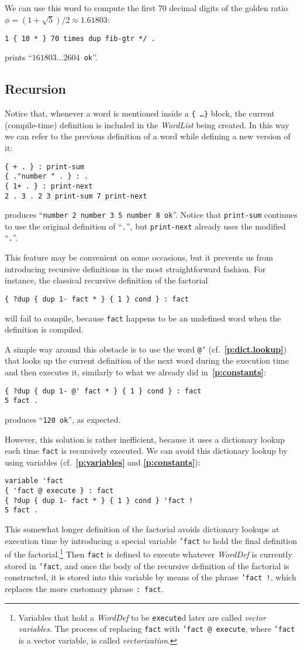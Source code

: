 \documentclass[12pt,oneside]{article}
\def\refpoint#1{{\rm\textbf{\ref{#1}}}}
\let\ptref=\refpoint
\def\mysubsection#1{\subsection{#1}\fancyhead[C]{\small{\textsc{\textrm{\thesubsection.} #1}}}}
\begin{document}
We can use this word to compute the first 70 decimal digits of the golden ratio $\phi=(1+\sqrt{5})/2\approx 1.61803$:
\begin{verbatim}
1 { 10 * } 70 times dup fib-gtr */ .
\end{verbatim}
prints ``{\tt $161803\ldots2604$ ok}''.

\mysubsection{Recursion}\label{p:recursion}
Notice that, whenever a word is mentioned inside a {\tt \{ \dots \}} block, the current (compile-time) definition is included in the {\em WordList\/} being created. In this way we can refer to the previous definition of a word while defining a new version of it:
\begin{verbatim}
{ + . } : print-sum
{ ."number " . } : .
{ 1+ . } : print-next
2 . 3 . 2 3 print-sum 7 print-next
\end{verbatim}
produces ``{\tt number 2 number 3 5 number 8 ok}''. Notice that {\tt print-sum} continues to use the original definition of ``{\tt .}'', but {\tt print-next} already uses the modified ``{\tt .}''.

This feature may be convenient on some occasions, but it prevents us from introducing recursive definitions in the most straightforward fashion. For instance, the classical recursive definition of the factorial
\begin{verbatim}
{ ?dup { dup 1- fact * } { 1 } cond } : fact
\end{verbatim}
will fail to compile, because {\tt fact} happens to be an undefined word when the definition is compiled.

A simple way around this obstacle is to use the word {\tt @'} (cf.~\ptref{p:dict.lookup}) that looks up the current definition of the next word during the execution time and then executes it, similarly to what we already did in~\ptref{p:constants}:
\begin{verbatim}
{ ?dup { dup 1- @' fact * } { 1 } cond } : fact
5 fact .
\end{verbatim}
produces ``{\tt 120 ok}'', as expected.

However, this solution is rather inefficient, because it uses a dictionary lookup each time {\tt fact} is recursively executed. We can avoid this dictionary lookup by using variables (cf.~\ptref{p:variables} and \ptref{p:constants}):
\begin{verbatim}
variable 'fact
{ 'fact @ execute } : fact
{ ?dup { dup 1- fact * } { 1 } cond } 'fact !
5 fact .
\end{verbatim}
This somewhat longer definition of the factorial avoids dictionary lookups at execution time by introducing a special variable {\tt 'fact} to hold the final definition of the factorial.\footnote{Variables that hold a {\em WordDef\/} to be {\tt execute}d later are called {\em vector variables}. The process of replacing {\tt fact} with {\tt 'fact @ execute}, where {\tt 'fact} is a vector variable, is called {\em vectorization}.} Then {\tt fact} is defined to execute whatever {\em WordDef} is currently stored in {\tt 'fact}, and once the body of the recursive definition of the factorial is constructed, it is stored into this variable by means of the phrase {\tt 'fact !}, which replaces the more customary phrase {\tt :\ fact}.
\end{document}
